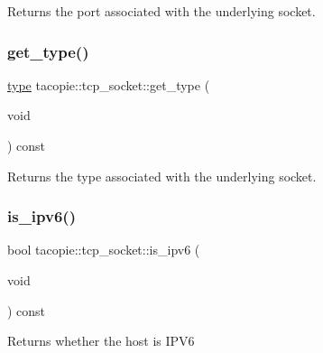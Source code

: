 \begin{DoxyReturn}{Returns}
the port associated with the underlying socket. 
\end{DoxyReturn}
\mbox{\label{classtacopie_1_1tcp__socket_a4f663be51b845520505bc20a88b411ee}} 
\subsubsection{\texorpdfstring{get\+\_\+type()}{get\_type()}}
{\footnotesize\ttfamily \hyperlink{classtacopie_1_1tcp__socket_ad8376e85df96ab9523f5d079ed7172ab}{type} tacopie\+::tcp\+\_\+socket\+::get\+\_\+type (\begin{DoxyParamCaption}\item[{void}]{ }\end{DoxyParamCaption}) const}

\begin{DoxyReturn}{Returns}
the type associated with the underlying socket. 
\end{DoxyReturn}
\mbox{\label{classtacopie_1_1tcp__socket_a6d9933c767572b03fbb4b5ced4bd1fc4}} 
\subsubsection{\texorpdfstring{is\+\_\+ipv6()}{is\_ipv6()}}
{\footnotesize\ttfamily bool tacopie\+::tcp\+\_\+socket\+::is\+\_\+ipv6 (\begin{DoxyParamCaption}\item[{void}]{ }\end{DoxyParamCaption}) const}

\begin{DoxyReturn}{Returns}
whether the host is I\+P\+V6 
\end{DoxyReturn}
\mbox{\label{classtacopie_1_1tcp__socket_af0957ded2a84fb06d940cba98df477fb}} 
